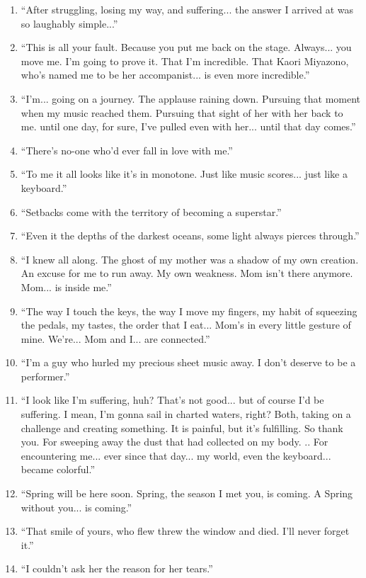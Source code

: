 \documentclass{book}
\numberwithin{equation}{section}
\begin{document}
\begin{enumerate}
    \item ``After struggling, losing my way, and suffering... the answer I arrived at was so laughably simple...''
    \item ``This is all your fault. Because you put me back on the stage. Always... you move me. I'm going to prove it. That I'm incredible. That Kaori Miyazono, who's named me to be her accompanist... is even more incredible.''
    \item ``I'm... going on a journey. The applause raining down. Pursuing that moment when my music reached them. Pursuing that sight of her with her back to me. until one day, for sure, I've pulled even with her... until that day comes.''
    \item ``There's no-one who'd ever fall in love with me.''
    \item ``To me it all looks like it's in monotone. Just like music scores... just like a keyboard.''
    \item ``Setbacks come with the territory of becoming a superstar.''
    \item ``Even it the depths of the darkest oceans, some light always pierces through.''
    \item ``I knew all along. The ghost of my mother was a shadow of my own creation. An excuse for me to run away. My own weakness. Mom isn't there anymore. Mom... is inside me.''
    \item ``The way I touch the keys, the way I move my fingers, my habit of squeezing the pedals, my tastes, the order that I eat... Mom's in every little gesture of mine. We're... Mom and I... are connected.''
    \item ``I'm a guy who hurled my precious sheet music away. I don't deserve to be a performer.''
    \item ``I look like I'm suffering, huh? That's not good... but of course I'd be suffering. I mean, I'm gonna sail in charted waters, right? Both, taking on a challenge and creating something. It is painful, but it's fulfilling. So thank you. For sweeping away the dust that had collected on my body. .. For encountering me... ever since that day... my world, even the keyboard... became colorful.''
    \item ``Spring will be here soon. Spring, the season I met you, is coming. A Spring without you... is coming.''
    \item ``That smile of yours, who flew threw the window and died. I'll never forget it.''
    \item ``I couldn't ask her the reason for her tears.''

\end{enumerate}
\end{document}
